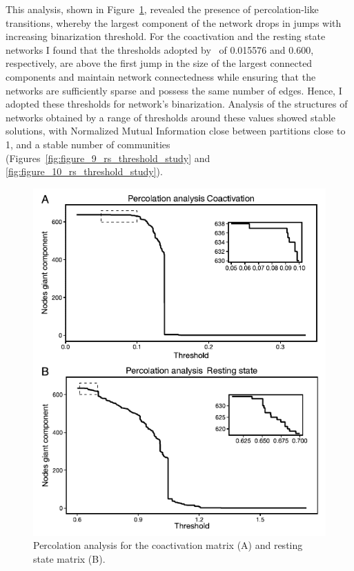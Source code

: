 This analysis, shown in Figure~\ref{fig:figure_8_percolation_analysis}, revealed the presence of percolation-like transitions, whereby the largest component of the network drops in jumps with increasing binarization threshold. For the coactivation and the resting state networks I found that the thresholds adopted by~\cite{crossley2013a} of 0.015576 and 0.600, respectively, are above the first jump in the size of the largest connected components and maintain network connectedness while ensuring that the networks are sufficiently sparse and possess the same number of edges. Hence, I adopted these thresholds for network's binarization. Analysis of the structures of networks obtained by a range of thresholds around these values showed stable solutions, with Normalized Mutual Information close between partitions close to 1, and a stable number of communities (Figures~\ref{fig:figure_9_rs_threshold_study} and \ref{fig:figure_10_rs_threshold_study}).

\begin{figure}[htb!]
\centering
\includegraphics[width=0.7\linewidth]{images/figure_8_percolation_analysis_compressed.pdf}
\caption{Percolation analysis for the coactivation matrix (A) and resting state matrix (B).}
\label{fig:figure_8_percolation_analysis}
\end{figure}

